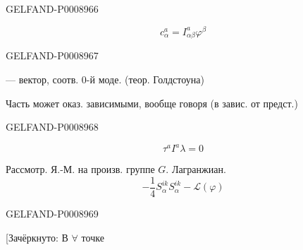 \begin{GelfandAdjacentEvidence}{GELFAND-P000896}{6}

\begin{equation*}
c^a_\alpha=I^a_{\alpha\beta}\varphi^\beta \tag{23}
\end{equation*}
\end{GelfandAdjacentEvidence}
\begin{GelfandAdjacentEvidence}{GELFAND-P000896}{7}

— вектор, соотв. 0-й моде. (теор. Голдстоуна)

Часть может оказ. зависимыми, вообще говоря (в завис. от предст.)
\end{GelfandAdjacentEvidence}
\begin{GelfandAdjacentEvidence}{GELFAND-P000896}{8}

\begin{equation*}
\tau^a I^a\lambda=0 \tag{24}
\end{equation*}

Рассмотр. Я.-М. на произв. группе $G$. Лагранжиан.
\begin{equation*}
-\frac14 S_\alpha^{ik}S_\alpha^{ik}-\mathcal L(\varphi)
\tag{25}
\end{equation*}
\end{GelfandAdjacentEvidence}
\begin{GelfandAdjacentEvidence}{GELFAND-P000896}{9}


[Зачёркнуто: В $\forall$ точке 
\end{GelfandAdjacentEvidence}
